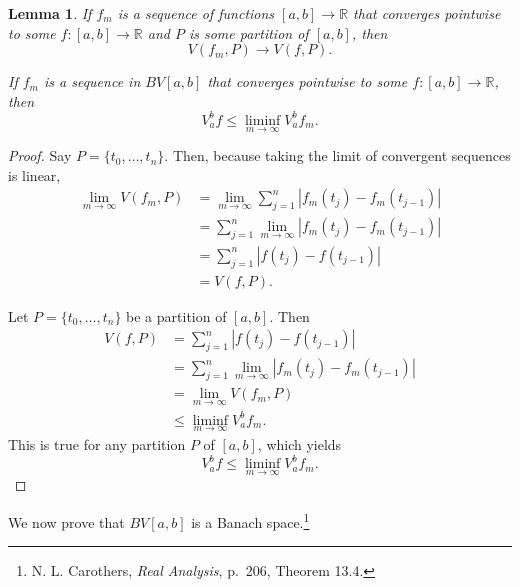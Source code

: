\documentclass{article}
\newtheorem{lemma}[theorem]{Lemma}
\theoremstyle{definition}
\begin{document}
\begin{lemma}
If $f_m$ is a sequence of functions $[a,b] \to \mathbb{R}$ that converges pointwise to some
$f:[a,b] \to \mathbb{R}$ and $P$ is some partition of $[a,b]$, then
\[
V(f_m,P) \to V(f,P).
\]

If $f_m$ is a sequence in $BV[a,b]$ that converges pointwise to some $f:[a,b] \to \mathbb{R}$, then
\[
V_a^b f \leq \liminf_{m \to \infty} V_a^b f_m.
\]
\label{pointwise}
\end{lemma}
\begin{proof}
Say $P=\{t_0,\ldots,t_n\}$. Then, because taking the limit of convergent sequences is linear,
\begin{align*}
\lim_{m \to \infty} V(f_m,P)&=\lim_{m \to \infty} \sum_{j=1}^n |f_m(t_j)-f_m(t_{j-1})|\\
&=\sum_{j=1}^n \lim_{m \to \infty}    |f_m(t_j)-f_m(t_{j-1})|\\
&=\sum_{j=1}^n |f(t_j)-f(t_{j-1})|\\
&=V(f,P).
\end{align*}

Let $P=\{t_0,\ldots,t_n\}$ be a partition of $[a,b]$.  Then
\begin{align*}
V(f,P)&=\sum_{j=1}^n |f(t_j)-f(t_{j-1})|\\
&= \sum_{j=1}^n \lim_{m \to \infty} |f_m(t_j)-f_m(t_{j-1})|\\
&= \lim_{m \to \infty} V(f_m,P)\\
&\leq \liminf_{m \to \infty} V_a^b f_m.
\end{align*}
This is true for any partition $P$ of $[a,b]$, which yields
\[
V_a^b f \leq \liminf_{m \to \infty} V_a^b f_m.
\]
\end{proof}

We now prove that $BV[a,b]$ is a Banach space.\footnote{N. L. Carothers, {\em Real Analysis}, p.~206, Theorem 13.4.}
\end{document}
